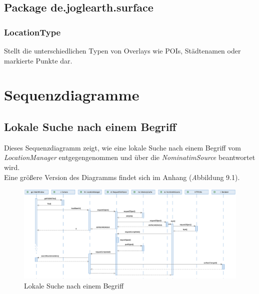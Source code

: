 \documentclass[10pt]{scrreprt}
\newcommand{\textref}[1]{\mbox{\raisebox{0.1ex}{\small$\rightarrow$ }\textit{#1}}}
\begin{document}
\vspace{5mm}
\section*{Package de.joglearth.surface}
\subsection*{LocationType}
Stellt die unterschiedlichen Typen von Overlays wie POIs, Städtenamen oder markierte Punkte dar.



\chapter{Sequenzdiagramme}

\section{Lokale Suche nach einem Begriff}
Dieses Sequenzdiagramm zeigt, wie eine lokale Suche nach einem Begriff vom \textit{LocationManager} entgegengenommen und über die \textit{NominatimSource} beantwortet wird.\\[3mm]
Eine größere Version des Diagramms findet sich im Anhang (\textref Abbildung 9.1).

\vspace*{5mm}
\begin{figure}[h]
\begin{center}
\includegraphics[scale=0.28]{sequenz-search.eps}
\caption{Lokale Suche nach einem Begriff}
\end{center}
\end{figure}
\end{document}
